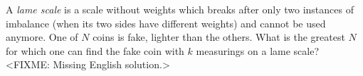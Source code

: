 \problem
A \emph{lame scale} is a scale without weights which breaks after only two
instances of imbalance (when its two sides have different weights) and cannot
be used anymore.
One of $N$ coins is fake, lighter than the others.
What is the greatest $N$ for which one can find the fake coin with $k$
measurings on a lame scale?
\solution
<FIXME: Missing English solution.>
\endproblem
